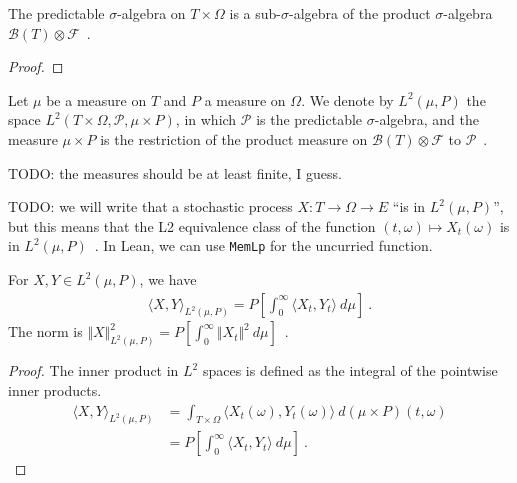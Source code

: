 \begin{lemma}\label{lem:Filtration.predictable_le_prod}
  \leanok
The predictable $\sigma$-algebra on $T \times \Omega$ is a sub-$\sigma$-algebra of the product $\sigma$-algebra $\mathcal{B}(T) \otimes \mathcal{F}$~.
\end{lemma}

\begin{proof}\leanok

\end{proof}


\begin{definition}\label{def:L2Predictable}
  \leanok
Let $\mu$ be a measure on $T$ and $P$ a measure on $\Omega$.
We denote by $L^2(\mu, P)$ the space $L^2(T \times \Omega, \mathcal{P}, \mu \times P)$, in which $\mathcal{P}$ is the predictable $\sigma$-algebra, and the measure $\mu \times P$ is the restriction of the product measure on $\mathcal{B}(T) \otimes \mathcal{F}$ to $\mathcal{P}$~.
\end{definition}

TODO: the measures should be at least finite, I guess.

TODO: we will write that a stochastic process $X : T \to \Omega \to E$ ``is in $L^2(\mu, P)$'', but this means that the L2 equivalence class of the function $(t, \omega) \mapsto X_t(\omega)$ is in $L^2(\mu, P)$~.
In Lean, we can use \texttt{MemLp} for the uncurried function.


\begin{lemma}\label{lem:L2Predictable.inner_eq}
For $X, Y \in L^2(\mu, P)$, we have
\begin{align*}
  \langle X, Y \rangle_{L^2(\mu, P)} = P\left[ \int_0^{\infty} \langle X_t, Y_t\rangle \: d\mu \right]
  \: .
\end{align*}
The norm is $\Vert X \Vert_{L^2(\mu, P)}^2 = P\left[ \int_0^{\infty} \Vert X_t \Vert^2 \: d\mu \right]$~.
\end{lemma}

\begin{proof}
The inner product in $L^2$ spaces is defined as the integral of the pointwise inner products.
\begin{align*}
  \langle X, Y \rangle_{L^2(\mu, P)}
  &= \int_{T \times \Omega} \langle X_t(\omega), Y_t(\omega) \rangle \: d(\mu \times P)(t, \omega)
  \\
  &= P\left[ \int_0^{\infty} \langle X_t, Y_t\rangle \: d\mu \right]
  \: .
\end{align*}
\end{proof}


